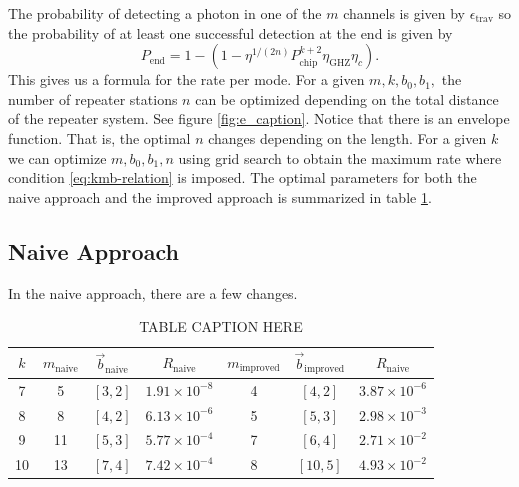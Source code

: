 \documentclass[%
 reprint,
 amsmath,amssymb
 aps,
]{revtex4}
\theoremstyle{remark}
\begin{document}
The probability of detecting a photon in one of the $m$ channels is given by $\epsilon_\text{trav}$ so the probability of at least one successful detection at the end is given by 
\begin{equation}
    P_\text{end} = 1 - (1-\eta^{1/(2n)}P_\text{chip}^{k+2}\eta_\text{GHZ}\eta_c).
\end{equation}
This gives us a formula for the rate per mode. For a given $m,k,b_0,b_1,$ the number of repeater stations $n$ can be optimized depending on the total distance of the repeater system. See figure \ref{fig:e_caption}. Notice that there is an envelope function. That is, the optimal $n$ changes depending on the length.
For a given $k$ we can optimize $m,b_0,b_1,n$ using grid search to obtain the maximum rate where condition \ref{eq:kmb-relation} is imposed. The optimal parameters for both the naive approach and the improved approach is summarized in table \ref{tab:table}.

\subsection{Naive Approach}
In the naive approach, there are a few changes.

\begin{table}
    \centering
    \begin{tabular}{|c|c|c|c|c|c|c|}
        \hline
        $k$ & $m_\text{naive}$ & $\vec{b}_\text{naive}$ & $R_\text{naive}$ & $m_\text{improved}$ & $\vec{b}_\text{improved}$ & $R_\text{naive}$ \\
        \hline
        7   & 5                & $[3, 2]$              & $1.91 \times 10^{-8}$ & 4                   & $[4, 2]$                 & $3.87 \times 10^{-6}$ \\
        8   & 8                & $[4, 2]$              & $6.13 \times 10^{-6}$ & 5                   & $[5, 3]$                 & $2.98 \times 10^{-3}$ \\
        9   & 11               & $[5, 3]$              & $5.77 \times 10^{-4}$ & 7                   & $[6, 4]$                 & $2.71 \times 10^{-2}$ \\
        10  & 13               & $[7, 4]$              & $7.42 \times 10^{-4}$ & 8                   & $[10, 5]$                & $4.93 \times 10^{-2}$ \\
        \hline
    \end{tabular}
    \caption{TABLE CAPTION HERE}
    \label{tab:table}
    \end{table}
\end{document}
